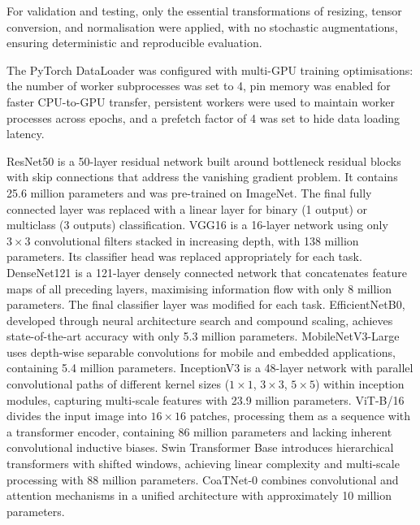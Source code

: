 \documentclass[final,3p,times,number]{elsarticle}
\begin{document}
For validation and testing, only the essential transformations of resizing, tensor conversion, and normalisation were applied, with no stochastic augmentations, ensuring deterministic and reproducible evaluation.

The PyTorch DataLoader was configured with multi-GPU training optimisations: the number of worker subprocesses was set to 4, pin memory was enabled for faster CPU-to-GPU transfer, persistent workers were used to maintain worker processes across epochs, and a prefetch factor of 4 was set to hide data loading latency.

ResNet50 is a 50-layer residual network built around bottleneck residual blocks with skip connections that address the vanishing gradient problem. It contains 25.6 million parameters and was pre-trained on ImageNet. The final fully connected layer was replaced with a linear layer for binary (1 output) or multiclass (3 outputs) classification. VGG16 is a 16-layer network using only $3\times 3$ convolutional filters stacked in increasing depth, with 138 million parameters. Its classifier head was replaced appropriately for each task. DenseNet121 is a 121-layer densely connected network that concatenates feature maps of all preceding layers, maximising information flow with only 8 million parameters. The final classifier layer was modified for each task. EfficientNetB0, developed through neural architecture search and compound scaling, achieves state-of-the-art accuracy with only 5.3 million parameters. MobileNetV3-Large uses depth-wise separable convolutions for mobile and embedded applications, containing 5.4 million parameters. InceptionV3 is a 48-layer network with parallel convolutional paths of different kernel sizes ($1\times 1$, $3\times 3$, $5\times 5$) within inception modules, capturing multi-scale features with 23.9 million parameters. ViT-B/16 divides the input image into $16\times 16$ patches, processing them as a sequence with a transformer encoder, containing 86 million parameters and lacking inherent convolutional inductive biases. Swin Transformer Base introduces hierarchical transformers with shifted windows, achieving linear complexity and multi-scale processing with 88 million parameters. CoaTNet-0 combines convolutional and attention mechanisms in a unified architecture with approximately 10 million parameters.
\end{document}
